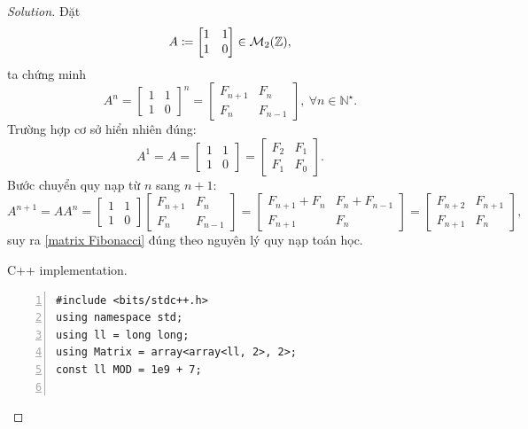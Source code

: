 \documentclass{article}
\begin{document}
\begin{proof}[Solution]
    Đặt
    \begin{equation*}
        A\coloneqq\begin{bmatrix}
            1 & 1\\1 & 0
        \end{bmatrix}\in{\cal M}_2(\mathbb{Z}),
    \end{equation*}
    ta chứng minh
    \begin{equation}
        \label{matrix Fibonacci}
        A^n = \begin{bmatrix}
            1 & 1\\1 & 0
        \end{bmatrix}^n = \begin{bmatrix}
            F_{n + 1} & F_n\\ F_n & F_{n - 1}
        \end{bmatrix},\ \forall n\in\mathbb{N}^\star.
    \end{equation}
    Trường hợp cơ sở hiển nhiên đúng:
     \begin{equation*}
         A^1 = A = \begin{bmatrix}
             1 & 1\\1 & 0
         \end{bmatrix} = \begin{bmatrix}
             F_2 & F_1\\ F_1 & F_0
         \end{bmatrix}.
     \end{equation*}
     Bước chuyển quy nạp từ $n$ sang $n + 1$:
     \begin{equation*}
         A^{n + 1} = AA^n = \begin{bmatrix}
             1 & 1\\1 & 0
         \end{bmatrix}\begin{bmatrix}
            F_{n + 1} & F_n\\ F_n & F_{n - 1}
         \end{bmatrix} = \begin{bmatrix}
            F_{n + 1} + F_n & F_n + F_{n - 1}\\ F_{n + 1} & F_n
         \end{bmatrix} = \begin{bmatrix}
            F_{n + 2} & F_{n + 1}\\ F_{n + 1} & F_n
         \end{bmatrix},
     \end{equation*}
     suy ra \eqref{matrix Fibonacci} đúng theo nguyên lý quy nạp toán học.
     \item {\sf C++ implementation.}
     \begin{Verbatim}[numbers=left,xleftmargin=0mm]
#include <bits/stdc++.h>
using namespace std;
using ll = long long;
using Matrix = array<array<ll, 2>, 2>;
const ll MOD = 1e9 + 7;


\end{Verbatim}
\end{proof}
\end{document}
